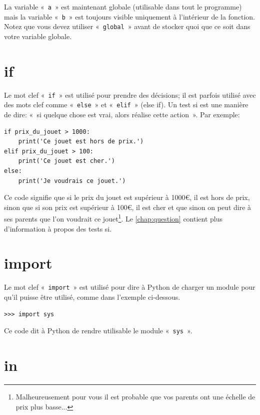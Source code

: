 La variable «~\texttt{a}~» est maintenant globale (utilisable dans tout le programme) mais la variable «~\texttt{b}~» est toujours visible uniquement à l'intérieur de la fonction. Notez que vous devez utiliser «~\texttt{global}~» avant de stocker quoi que ce soit dans votre variable globale.

\section*{if}

Le mot clef «~\texttt{if}~» est utilisé pour prendre des décisions; il est parfois utilisé avec des mots clef comme «~\texttt{else}~» et «~\texttt{elif}~» (else if). Un test si est une manière de dire: «~si quelque chose est vrai, alors réalise cette action~». Par exemple:

\begin{Verbatim}[frame=single,rulecolor=\color{gray}]
if prix_du_jouet > 1000:
    print('Ce jouet est hors de prix.')
elif prix_du_jouet > 100:
    print('Ce jouet est cher.')
else:
    print('Je voudrais ce jouet.')
\end{Verbatim}

Ce code signifie que si le prix du jouet est supérieur à 1000{€}, il est hors de prix, sinon que si son prix est supérieur à 100{€}, il est cher et que sinon on peut dire à ses parents que l'on voudrait ce jouet\footnote{Malheureusement  pour vous il est probable que vos parents ont une échelle de prix plus basse...}.  Le \autoref{chap:question} contient plus d'information à propos des tests si.

\section*{import}
Le mot clef «~\texttt{import}~»  est utilisé pour dire à Python de charger un module pour qu'il puisse être utilisé, comme dans l'exemple ci-dessous.


\begin{Verbatim}[frame=single,rulecolor=\color{gray}]
>>> import sys
\end{Verbatim}

Ce code dit à Python de rendre utilisable le module «~\texttt{sys}~».

\section*{in}

